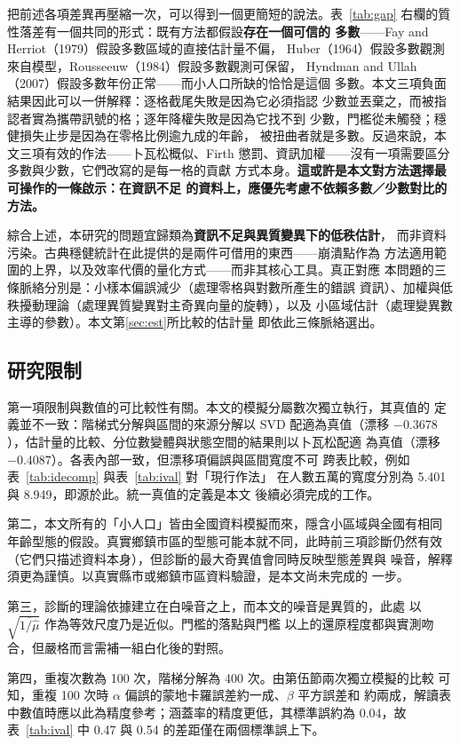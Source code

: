 \documentclass[UTF8, fontset=macnew, a4paper, 12pt]{ctexart}
\newcommand{\cn}[1]{\ding{\number\numexpr171+#1\relax}}
\begin{document}
把前述各項差異再壓縮一次，可以得到一個更簡短的說法。表~\ref{tab:gap}
右欄的質性落差有一個共同的形式：既有方法都假設\textbf{存在一個可信的
多數}——Fay and Herriot（1979）假設多數區域的直接估計量不偏，
Huber（1964）假設多數觀測來自模型，Rousseeuw（1984）假設多數觀測可保留，
Hyndman and Ullah（2007）假設多數年份正常——而小人口所缺的恰恰是這個
多數。本文三項負面結果因此可以一併解釋：逐格截尾失敗是因為它必須指認
少數並丟棄之，而被指認者實為攜帶訊號的格；逐年降權失敗是因為它找不到
少數，門檻從未觸發；穩健損失止步是因為在零格比例逾九成的年齡，
被扭曲者就是多數。反過來說，本文三項有效的作法——卜瓦松概似、Firth
懲罰、資訊加權——沒有一項需要區分多數與少數，它們改寫的是每一格的貢獻
方式本身。\textbf{這或許是本文對方法選擇最可操作的一條啟示：在資訊不足
的資料上，應優先考慮不依賴多數／少數對比的方法。}

綜合上述，本研究的問題宜歸類為\textbf{資訊不足與異質變異下的低秩估計}，
而非資料污染。古典穩健統計在此提供的是兩件可借用的東西——崩潰點作為
方法適用範圍的上界，以及效率代價的量化方式——而非其核心工具。真正對應
本問題的三條脈絡分別是：小樣本偏誤減少（處理零格與對數所產生的錯誤
資訊）、加權與低秩擾動理論（處理異質變異對主奇異向量的旋轉），以及
小區域估計（處理變異數主導的參數）。本文第\ref{sec:est}所比較的估計量
即依此三條脈絡選出。

\subsection{研究限制}

第一項限制與數值的可比較性有關。本文的模擬分屬數次獨立執行，其真值的
定義並不一致：階梯式分解與區間的來源分解以 SVD 配適為真值（漂移
$-0.3678$），估計量的比較、分位數變體與狀態空間的結果則以卜瓦松配適
為真值（漂移 $-0.4087$）。各表內部一致，但漂移項偏誤與區間寬度不可
跨表比較，例如表~\ref{tab:idecomp} 與表~\ref{tab:ival} 對「現行作法」
在人數五萬的寬度分別為 5.401 與 8.949，即源於此。統一真值的定義是本文
後續必須完成的工作。

第二，本文所有的「小人口」皆由全國資料模擬而來，隱含小區域與全國有相同
年齡型態的假設。真實鄉鎮市區的型態可能本就不同，此時前三項診斷仍然有效
（它們只描述資料本身），但診斷\cn{4}的最大奇異值會同時反映型態差異與
噪音，解釋須更為謹慎。以真實縣市或鄉鎮市區資料驗證，是本文尚未完成的
一步。

第三，診斷\cn{4}的理論依據建立在白噪音之上，而本文的噪音是異質的，此處
以 $\sqrt{\overline{1/\hat\mu}}$ 作為等效尺度乃是近似。門檻的落點與門檻
以上的還原程度都與實測吻合，但嚴格而言需補一組白化後的對照。

第四，重複次數為 100 次，階梯分解為 400 次。由第伍節兩次獨立模擬的比較
可知，重複 100 次時 $\alpha$ 偏誤的蒙地卡羅誤差約一成、$\beta$ 平方誤差和
約兩成，解讀表中數值時應以此為精度參考；涵蓋率的精度更低，其標準誤約為
0.04，故表~\ref{tab:ival} 中 0.47 與 0.54 的差距僅在兩個標準誤上下。
\end{document}
